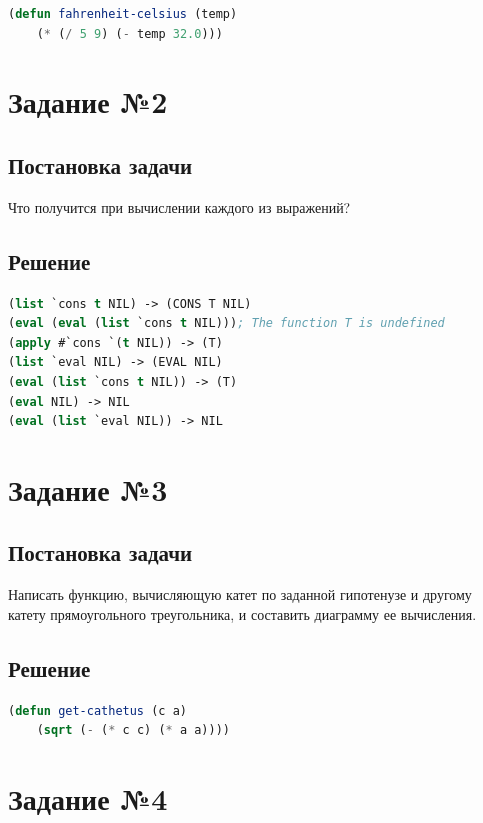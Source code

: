 \documentclass[12pt]{report}
\begin{document}
\begin{lstlisting}[label=first,caption=Решение задания №1, language=lisp]
(defun fahrenheit-celsius (temp)
	(* (/ 5 9) (- temp 32.0)))
\end{lstlisting}

\section*{Задание №2}
\subsection*{Постановка задачи}
Что получится при вычислении каждого из выражений?

\subsection*{Решение}

\begin{lstlisting}[label=second,caption=Решение задания №2, language=lisp]
(list `cons t NIL) -> (CONS T NIL)
(eval (eval (list `cons t NIL))); The function T is undefined
(apply #`cons `(t NIL)) -> (T)
(list `eval NIL) -> (EVAL NIL)
(eval (list `cons t NIL)) -> (T)
(eval NIL) -> NIL
(eval (list `eval NIL)) -> NIL
\end{lstlisting}

\section*{Задание №3}
\subsection*{Постановка задачи}
Написать функцию, вычисляющую катет по заданной гипотенузе и другому катету прямоугольного треугольника, и составить диаграмму ее вычисления.

\subsection*{Решение}
\begin{lstlisting}[label=third,caption=Решение задания №3, language=lisp]
(defun get-cathetus (c a)
	(sqrt (- (* c c) (* a a))))
\end{lstlisting}

\section*{Задание №4}
\end{document}
